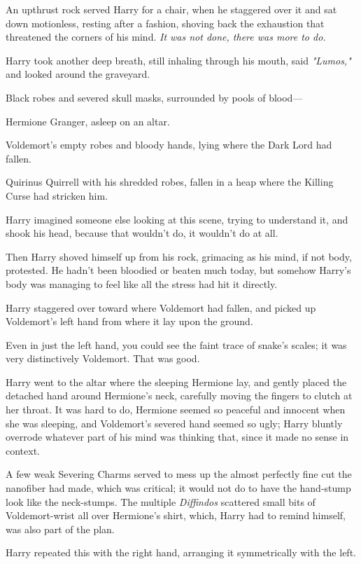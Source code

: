 An upthrust rock served Harry for a chair, when he staggered over it and sat
down motionless, resting after a fashion, shoving back the exhaustion that
threatened the corners of his mind. \emph{It was not done, there was more to
do.}

Harry took another deep breath, still inhaling through his mouth, said
\emph{"Lumos,"} and looked around the graveyard.

Black robes and severed skull masks, surrounded by pools of blood\mbox{---}

Hermione Granger, asleep on an altar.

Voldemort's empty robes and bloody hands, lying where the Dark Lord had fallen.

Quirinus Quirrell with his shredded robes, fallen in a heap where the Killing
Curse had stricken him.

Harry imagined someone else looking at this scene, trying to understand it, and
shook his head, because that wouldn't do, it wouldn't do at all.

Then Harry shoved himself up from his rock, grimacing as his mind, if not body,
protested. He hadn't been bloodied or beaten much today, but somehow Harry's
body was managing to feel like all the stress had hit it directly.

Harry staggered over toward where Voldemort had fallen, and picked up
Voldemort's left hand from where it lay upon the ground.

Even in just the left hand, you could see the faint trace of snake's scales; it
was very distinctively Voldemort. That was good.

Harry went to the altar where the sleeping Hermione lay, and gently placed the
detached hand around Hermione's neck, carefully moving the fingers to clutch at
her throat. It was hard to do, Hermione seemed so peaceful and innocent when
she was sleeping, and Voldemort's severed hand seemed so ugly; Harry bluntly
overrode whatever part of his mind was thinking that, since it made no sense in
context.

A few weak Severing Charms served to mess up the almost perfectly fine cut the
nanofiber had made, which was critical; it would not do to have the hand-stump
look like the neck-stumps. The multiple \emph{Diffindos} scattered small bits
of Voldemort-wrist all over Hermione's shirt, which, Harry had to remind
himself, was also part of the plan.

Harry repeated this with the right hand, arranging it symmetrically with the
left.

